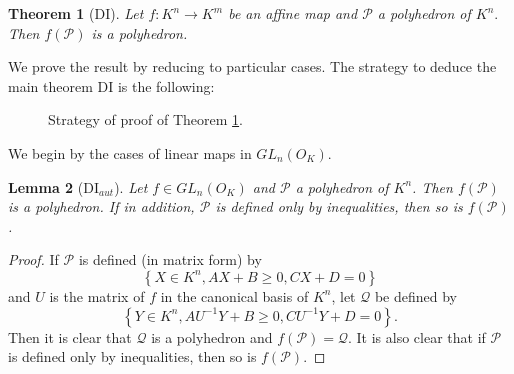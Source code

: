 \documentclass[a4paper,oneside,10pt]{article}
\newtheorem{theorem}{Theorem}[section]
\newtheorem{lemma}[theorem]{Lemma}
\newcommand{\PP}{\mathcal{P}}
\newcommand{\Qc}{\mathcal{Q}}
\begin{document}
\begin{theorem}[DI] 
Let $f : K^n \to K^m$ be an affine map and $\PP$ a polyhedron of $K^n.$
Then $f(\PP)$ is a polyhedron. \label{theo:DI}
\end{theorem}

We prove the result by reducing to particular cases.
The strategy to deduce the main theorem DI 
is the following:
\begin{figure}[htbp]
\centering
{}
\caption{Strategy of proof of Theorem \ref{theo:DI}.}
\label{fig:di-properties}
\end{figure}



We begin by the cases of linear maps in $GL_n(O_K)$.

\begin{lemma}[DI${}_{aut}$]
Let $f \in GL_n(O_K)$ and $\PP$ a polyhedron of $K^n$.
Then $f(\PP)$ is a polyhedron. \label{lem:DIaut}
If in addition, $\PP$ is defined only by inequalities,
then so is $f(\PP)$.
\end{lemma}
\begin{proof}
If $\PP$ is defined (in matrix form) by \[\left\lbrace X \in K^n,  AX+B \geq 0, CX+D=0 \right\rbrace\] and $U$ is the matrix of $f$ in the canonical basis of $K^n$, 
let $\Qc$ be defined by \[\left\lbrace Y \in K^n,  AU^{-1} Y+B \geq 0, CU^{-1} Y+D=0 \right\rbrace.\]
Then it is clear that $\Qc$ is a polyhedron and $f(\PP)=\Qc.$
It is also clear that if $\PP$ is defined only by inequalities,
then so is $f(\PP)$.
\end{proof}
\end{document}
